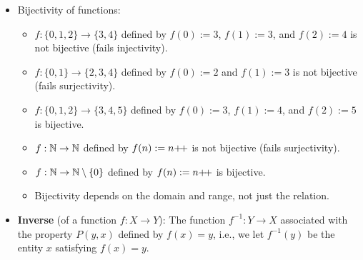 \documentclass[../main.tex]{subfiles}
\begin{document}
\begin{itemize}
\begin{itemize}
    \end{itemize}
    \item Bijectivity of functions:
    \begin{itemize}
        \item $f:\{0,1,2\}\to\{3,4\}$ defined by $f(0):=3$, $f(1):=3$, and $f(2):=4$ is not bijective (fails injectivity).
        \item $f:\{0,1\}\to\{2,3,4\}$ defined by $f(0):=2$ and $f(1):=3$ is not bijective (fails surjectivity).
        \item $f:\{0,1,2\}\to\{3,4,5\}$ defined by $f(0):=3$, $f(1):=4$, and $f(2):=5$ is bijective.
        \item $f:\mathbb{N}\to\mathbb{N}$ defined by $f(n):=n{+\!+}$ is not bijective (fails surjectivity).
        \item $f:\mathbb{N}\to\mathbb{N}\setminus\{0\}$ defined by $f(n):=n{+\!+}$ is bijective.
        \item Bijectivity depends on the domain and range, not just the relation.
    \end{itemize}
    \item \textbf{Inverse} (of a function $f:X\to Y$): The function $f^{-1}:Y\to X$ associated with the property $P(y,x)$ defined by $f(x)=y$, i.e., we let $f^{-1}(y)$ be the entity $x$ satisfying $f(x)=y$.
\end{itemize}
\end{document}
